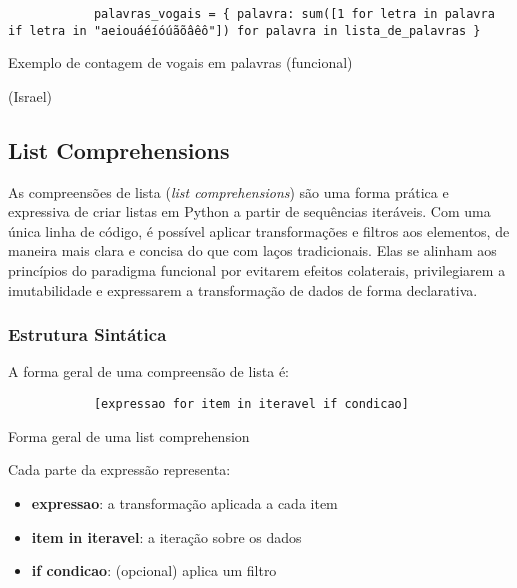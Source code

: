 \documentclass[date,twocolumn,a4paper]{ppgem}
\begin{document}
    \begin{listing}[!ht]
        \begin{verbatim}
            palavras_vogais = { palavra: sum([1 for letra in palavra if letra in "aeiouáéíóúãõâêô"]) for palavra in lista_de_palavras }
        \end{verbatim}
        \caption{Exemplo de contagem de vogais em palavras (funcional)}
        \label{listing:2}
    \end{listing}

    (Israel)
    \subsection{List Comprehensions}
    As compreensões de lista (\textit{list comprehensions}) são uma forma prática e expressiva de criar listas em Python a partir de sequências iteráveis. Com uma única linha de código, é possível aplicar transformações e filtros aos elementos, de maneira mais clara e concisa do que com laços tradicionais. Elas se alinham aos princípios do paradigma funcional por evitarem efeitos colaterais, privilegiarem a imutabilidade e expressarem a transformação de dados de forma declarativa.

    \subsubsection{Estrutura Sintática}
    A forma geral de uma compreensão de lista é:

    \begin{listing}[!ht]
        \begin{verbatim}
            [expressao for item in iteravel if condicao]
        \end{verbatim}
        \caption{Forma geral de uma list comprehension}
        \label{listing:2}
    \end{listing}

    Cada parte da expressão representa:
    \begin{itemize}
        \item \textbf{expressao}: a transformação aplicada a cada item
        \item \textbf{item in iteravel}: a iteração sobre os dados
        \item \textbf{if condicao}: (opcional) aplica um filtro
    \end{itemize}
\end{document}
